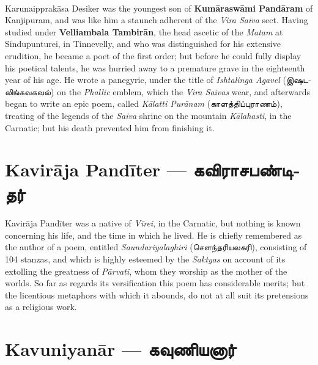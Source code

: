 \documentclass{article}
\newcommand{\TamilText}[1]{\texttamil{#1}}
\newcommand{\TamilBold}[1]{\texttamil{\textbf{#1}}}
\newcommand{\tam}[1]{\TamilText{#1}}
\newcommand{\tambold}[1]{\TamilBold{#1}}
\begin{document}
\paragraph{}
Karunaipprak\={a}sa Desiker was the youngest son of \textbf{Kum\={a}rasw\={a}mi Pand\={a}ram} of Kanjipuram, and was like him a staunch adherent of the \emph{Vira Saiva} sect. Having studied under \textbf{Velliambala Tambir\={a}n}, the head ascetic of the \emph{Matam} at Sindupunturei, in Tinnevelly, and who was distinguished for his extensive erudition, he became a poet of the first order; but before he could fully display his poetical talents, he was hurried away to a premature grave in the eighteenth year of his age. He wrote a panegyric, under the title of \emph{Ishtalinga Agavel} (\tam{இஷடலிங்கவகவல்}) on the \emph{Phallic} emblem, which the \emph{Vira Saivas} wear, and afterwards began to write an epic poem, called \emph{K\={a}latti Pur\={a}nam} (\tam{காளத்திப்புராணம்}), treating of the legends of the \emph{Saiva} shrine on the mountain \emph{K\={a}lahasti}, in the Carnatic; but his death prevented him from finishing it.

\section{Kavir\={a}ja Pand\={i}ter --- \tambold{கவிராசபண்டிதர்}}
\paragraph{}
Kavir\={a}ja Pand\={i}ter was a native of \emph{V\={i}rei}, in the Carnatic, but nothing is known concerning his life, and the time in which he lived. He is chiefly remembered as the author of a poem, entitled \emph{Saundariyalaghiri} (\tam{செளந்தரியலகரி}), consisting of 104 stanzas, and which is highly esteemed by the \emph{Saktyas} on account of its extolling the greatness of \emph{P\={a}rvati}, whom they worship as the mother of the worlds. So far as regards its versification this poem has considerable merits; but the licentious metaphors with which it abounds, do not at all suit its pretensions as a religious work.

\section{Kavuniyan\={a}r --- \tambold{கவுணியனார்}}
\end{document}
